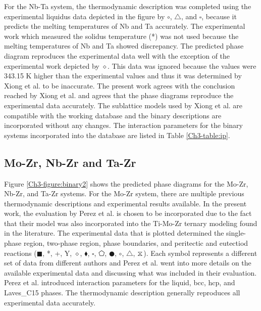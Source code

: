 For the Nb-Ta system, the thermodynamic description was completed using the experimental liquidus data \cite{Xiong2004} depicted in the figure by $\circ$, $\bigtriangleup$, and $\square$, because it predicts the melting temperatures of Nb and Ta accurately. The experimental work which measured the solidus temperature (*) was not used because the melting temperatures of Nb and Ta showed discrepancy. The predicted phase diagram reproduces the experimental data well with the exception of the experimental work depicted by $\diamond$. This data was ignored because the values were 343.15 K higher than the experimental values and thus it was determined by Xiong et al. \cite{Xiong2004} to be inaccurate. The present work agrees with the conclusion reached by Xiong et al. \cite{Xiong2004} and agrees that the phase diagrams reproduce the experimental data accurately. The sublattice models used by Xiong et al. \cite{Xiong2004} are compatible with the working database and the binary descriptions are incorporated without any changes. The interaction parameters for the binary systems incorporated into the database are listed in Table \ref{Ch3-table:ip}. 

\subsection{Mo-Zr, Nb-Zr and Ta-Zr}

Figure \ref{Ch3-figure:binary2} shows the predicted phase diagrams for the Mo-Zr, Nb-Zr, and Ta-Zr systems. For the Mo-Zr system, there are multiple previous thermodynamic descriptions and experimental results available. In the present work, the evaluation by Perez et al. \cite{Perez2003} is chosen to be incorporated due to the fact that their model was also incorporated into the Ti-Mo-Zr ternary modeling found in the literature. The experimental data that is plotted determined the single-phase region, two-phase region, phase boundaries, and peritectic and eutectiod reactions ($\blacksquare$, *, +, Y, $\diamond$, $\blacklozenge$, $\square$, $\pentagon$, $\CIRCLE$, $\circ$, $\bigtriangleup$, $\hourglasses$ ). Each symbol represents a different set of data from different authors and Perez et al. \cite{Perez2003} went into more details on the available experimental data and discussing what was included in their evaluation. Perez et al. \cite{Perez2003} introduced interaction parameters for the liquid, bcc, hcp, and Laves\_C15 phases. The thermodynamic description generally reproduces all experimental data accurately. 

